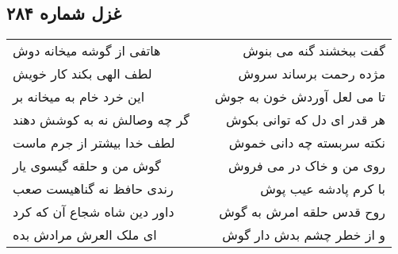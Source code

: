 \begin{center}
\section*{غزل شماره ۲۸۴}
\label{sec:sh284}
\begin{longtable}{l p{0.5cm} r}
هاتفی از گوشه میخانه دوش
&&
گفت ببخشند گنه می بنوش
\\
لطف الهی بکند کار خویش
&&
مژده رحمت برساند سروش
\\
این خرد خام به میخانه بر
&&
تا می لعل آوردش خون به جوش
\\
گر چه وصالش نه به کوشش دهند
&&
هر قدر ای دل که توانی بکوش
\\
لطف خدا بیشتر از جرم ماست
&&
نکته سربسته چه دانی خموش
\\
گوش من و حلقه گیسوی یار
&&
روی من و خاک در می فروش
\\
رندی حافظ نه گناهیست صعب
&&
با کرم پادشه عیب پوش
\\
داور دین شاه شجاع آن که کرد
&&
روح قدس حلقه امرش به گوش
\\
ای ملک العرش مرادش بده
&&
و از خطر چشم بدش دار گوش
\\
\end{longtable}
\end{center}

